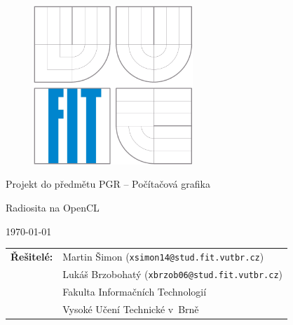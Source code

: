 \begin{titlepage}

\vspace*{1cm}

\begin{figure}
  \centering
  \includegraphics[height=6cm]{images/fit}
\end{figure}

\vspace*{5mm}

\begin{center}
\begin{Large}
Projekt do předmětu PGR -- Počítačová grafika
\end{Large}
\end{center}

\vspace*{5mm}

\begin{center}
\begin{Huge}
Radiosita na OpenCL \\
\end{Huge}
\end{center}

\vspace*{1cm}

\begin{center}
\begin{Large}
\today
\end{Large}
\end{center}

\vfill

\begin{flushleft}
\begin{large}
\begin{tabular}{ll}

\bf Řešitelé:\hspace{3mm} & Martin Šimon (\verb_xsimon14@stud.fit.vutbr.cz_) \\
& Lukáš Brzobohatý (\verb_xbrzob06@stud.fit.vutbr.cz_) \\
& Fakulta Informačních Technologií \\
& Vysoké Učení Technické v~Brně

\end{tabular}
\end{large}
\end{flushleft}

\end{titlepage}

